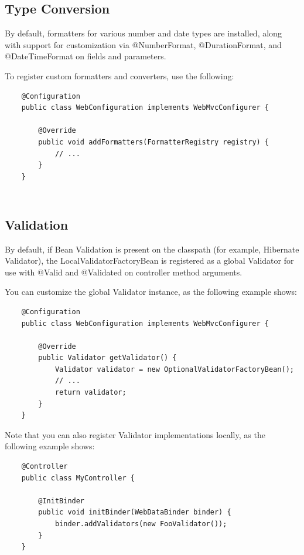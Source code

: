 \documentclass{scrartcl}
\begin{document}
\subsection{Type Conversion}

By default, formatters for various number and date types are installed, along with support for customization via @NumberFormat, @DurationFormat, and @DateTimeFormat on fields and parameters.

To register custom formatters and converters, use the following:

\begin{lstlisting}
    @Configuration
    public class WebConfiguration implements WebMvcConfigurer {

        @Override
        public void addFormatters(FormatterRegistry registry) {
            // ...
        }
    }
\end{lstlisting}

\begin{lstlisting}
\end{lstlisting}

\begin{lstlisting}
\end{lstlisting}

\subsection{Validation}

By default, if Bean Validation is present on the classpath (for example, Hibernate Validator), the LocalValidatorFactoryBean is registered as a global Validator for use with @Valid and @Validated on controller method arguments.

You can customize the global Validator instance, as the following example shows:

\begin{lstlisting}
    @Configuration
    public class WebConfiguration implements WebMvcConfigurer {

        @Override
        public Validator getValidator() {
            Validator validator = new OptionalValidatorFactoryBean();
            // ...
            return validator;
        }
    }
\end{lstlisting}

Note that you can also register Validator implementations locally, as the following example shows:

\begin{lstlisting}
    @Controller
    public class MyController {

        @InitBinder
        public void initBinder(WebDataBinder binder) {
            binder.addValidators(new FooValidator());
        }
    }

\end{lstlisting}
\end{document}
